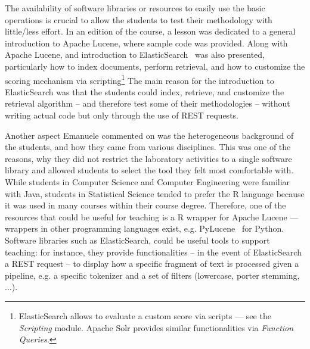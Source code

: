 The availability of software libraries or resources to easily use the basic operations is crucial to allow the students to test their methodology with little/less effort. In an edition of the course, a lesson was dedicated to a general introduction to Apache Lucene, where sample code was  provided. Along with Apache Lucene, and introduction to ElasticSearch~\cite{elasticsearch} was also presented, particularly how to index documents, perform retrieval, and how to customize the scoring mechanism via scripting\footnote{\scriptsize{ElasticSearch allows to evaluate a custom score via scripts --- see the {\em Scripting} module. Apache Solr provides similar functionalities via {\em Function Queries}.}} The main reason for the introduction to ElasticSearch was that the students could index, retrieve, and customize the retrieval algorithm -- and therefore test some of their methodologies -- without writing actual code but only through the use of REST requests.

Another aspect Emanuele commented on was the heterogeneous background of the students, and how they came from various disciplines. This was one of the reasons, why they did not restrict the laboratory activities to a single software library and  allowed students to select the tool they felt most comfortable with. While students in Computer Science and Computer Engineering were familiar with Java, students in Statistical Science tended to prefer the R language because it was used in many courses within their course degree. Therefore, one of the resources that could be useful for teaching is a R wrapper for Apache Lucene --- wrappers in other programming languages exist, e.g. PyLucene~\cite{PyLucene} for Python. Software libraries such as ElasticSearch, could be useful tools to support teaching: for instance, they provide functionalities -- in the event of ElasticSearch a REST request -- to display how a specific fragment of text is processed given a pipeline, e.g. a specific tokenizer and a set of filters (lowercase, porter stemming, $\dots$).



